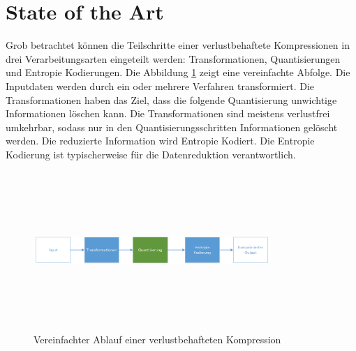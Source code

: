 \section{State of the Art}
Grob betrachtet können die Teilschritte einer verlustbehaftete Kompressionen in drei Verarbeitungsarten eingeteilt werden: Transformationen, Quantisierungen und Entropie Kodierungen. Die Abbildung \ref{state:aufbau} zeigt eine vereinfachte Abfolge. Die Inputdaten werden durch ein oder mehrere Verfahren transformiert. Die Transformationen haben das Ziel, dass die folgende Quantisierung unwichtige Informationen löschen kann. Die Transformationen sind meistens verlustfrei umkehrbar, sodass nur in den Quantisierungsschritten Informationen gelöscht werden. Die reduzierte Information wird Entropie Kodiert. Die Entropie Kodierung ist typischerweise für die Datenreduktion verantwortlich.\\
\begin{figure}[!htbp]
	\center
	\includegraphics[width=0.8\textwidth,height=6cm,keepaspectratio]{./pictures/state/aufbau.png}
	\caption{Vereinfachter Ablauf einer verlustbehafteten Kompression}
	\label{state:aufbau}
\end{figure}

